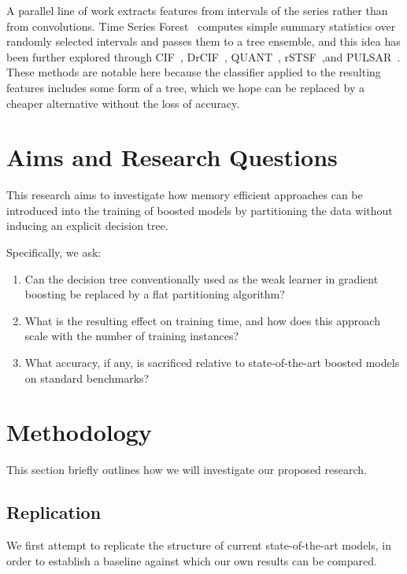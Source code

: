 \documentclass[a4paper, draft, 12pt]{article}
\begin{document}
A parallel line of work extracts features from intervals of the series rather
than from convolutions. Time Series Forest~\cite{deng2013tsf} computes simple
summary statistics over randomly selected intervals and passes them to a tree
ensemble, and this idea has been further explored through
CIF~\cite{middlehurst2020cif}, DrCIF~\cite{middlehurst2021hivecote2},
QUANT~\cite{dempster2024quant}, rSTSF~\cite{cabello2021rstsf},and
PULSAR~\cite{pulsar}. These methods are notable here because the classifier
applied to the resulting features includes some form of a tree, which we hope
can be replaced by a cheaper alternative without the loss of accuracy.

\section{Aims and Research Questions}

This research aims to investigate how memory efficient approaches can be
introduced into the training of boosted models by partitioning the data without
inducing an explicit decision tree.

Specifically, we ask:

\begin{enumerate}
    \item Can the decision tree conventionally used as the weak learner in gradient
          boosting be replaced by a flat partitioning algorithm?
    \item What is the resulting effect on training time, and how does this approach scale
          with the number of training instances?
    \item What accuracy, if any, is sacrificed relative to state-of-the-art boosted
          models on standard benchmarks?
\end{enumerate}

\section{Methodology}

This section briefly outlines how we will investigate our proposed research.

\subsection{Replication}

We first attempt to replicate the structure of current state-of-the-art models,
in order to establish a baseline against which our own results can be compared.
\end{document}
